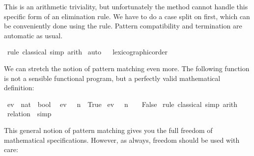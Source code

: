 \begin{isabellebody}
\begin{isamarkuptxt}
  This is an arithmetic triviality, but unfortunately the
   method cannot handle this specific form of an
  elimination rule. We have to do a case split on  first,
  which can be conveniently done using the  rule. Pattern compatibility and termination are automatic as usual.%
\end{isamarkuptxt}%
\isamarkuptrue%
%
\endisatagproof
{\isafoldproof}%
%
\isadelimproof
%
\endisadelimproof
%
\isadelimML
%
\endisadelimML
%
\isatagML
%
\endisatagML
{\isafoldML}%
%
\isadelimML
%
\endisadelimML
\isanewline
%
\isadelimproof
%
\endisadelimproof
%
\isatagproof
{}\isamarkupfalse%
\ {\isacharparenleft}rule\ classical{\isacharcomma}\ simp{\isacharcomma}\ arith{\isacharparenright}\isanewline
{}\isamarkupfalse%
\ auto\isanewline
{}\isamarkupfalse%
%
\endisatagproof
{\isafoldproof}%
%
\isadelimproof
%
\endisadelimproof
\isanewline
{}\isamarkupfalse%
%
\isadelimproof
\ %
\endisadelimproof
%
\isatagproof
{}\isamarkupfalse%
\ lexicographic{\isacharunderscore}order%
\endisatagproof
{\isafoldproof}%
%
\isadelimproof
%
\endisadelimproof
%
\begin{isamarkuptext}%
We can stretch the notion of pattern matching even more. The
  following function is not a sensible functional program, but a
  perfectly valid mathematical definition:%
\end{isamarkuptext}%
\isamarkuptrue%
\isamarkupfalse%
\ ev\ {\isacharcolon}{\isacharcolon}\ {\isachardoublequoteopen}nat\ {\isasymRightarrow}\ bool{\isachardoublequoteclose}\isanewline
{}\isanewline
\ \ {\isachardoublequoteopen}ev\ {\isacharparenleft}{}\ {\isacharasterisk}\ n{\isacharparenright}\ {\isacharequal}\ True{\isachardoublequoteclose}\isanewline
{\isacharbar}\ {\isachardoublequoteopen}ev\ {\isacharparenleft}{}\ {\isacharasterisk}\ n\ {\isacharplus}\ {}{\isacharparenright}\ {\isacharequal}\ False{\isachardoublequoteclose}\isanewline
%
\isadelimproof
%
\endisadelimproof
%
\isatagproof
{}\isamarkupfalse%
\ {\isacharparenleft}rule\ classical{\isacharcomma}\ simp{\isacharparenright}\ arith{\isacharplus}%
\endisatagproof
{\isafoldproof}%
%
\isadelimproof
\isanewline
%
\endisadelimproof
{}\isamarkupfalse%
%
\isadelimproof
\ %
\endisadelimproof
%
\isatagproof
{}\isamarkupfalse%
\ {\isacharparenleft}relation\ {\isachardoublequoteopen}{\isacharbraceleft}{\isacharbraceright}{\isachardoublequoteclose}{\isacharparenright}\ simp%
\endisatagproof
{\isafoldproof}%
%
\isadelimproof
%
\endisadelimproof
%
\begin{isamarkuptext}%
This general notion of pattern matching gives you the full freedom
  of mathematical specifications. However, as always, freedom should
  be used with care:


\end{isamarkuptext}
\end{isabellebody}
